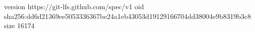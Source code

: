 version https://git-lfs.github.com/spec/v1
oid sha256:dd6d21369ee5053336367be24a1eb43053d19129166704dd38004e9b8319b3c8
size 16174
